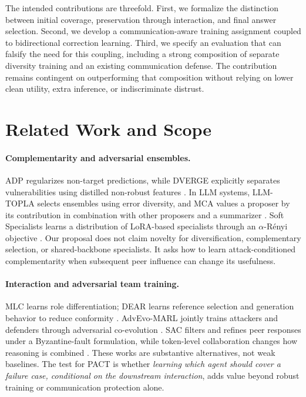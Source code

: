 \documentclass[10pt,twocolumn]{article}
\newcommand{\method}{\textsc{PACT}}
\begin{document}
The intended contributions are threefold. First, we formalize the distinction between initial coverage, preservation through interaction, and final answer selection. Second, we develop a communication-aware training assignment coupled to bidirectional correction learning. Third, we specify an evaluation that can falsify the need for this coupling, including a strong composition of separate diversity training and an existing communication defense. The contribution remains contingent on outperforming that composition without relying on lower clean utility, extra inference, or indiscriminate distrust.

\section{Related Work and Scope}
\label{sec:related}
\paragraph{Complementarity and adversarial ensembles.}
ADP regularizes non-target predictions, while DVERGE explicitly separates vulnerabilities using distilled non-robust features \citep{pang2019adp,yang2020dverge}. In LLM systems, LLM-TOPLA selects ensembles using error diversity, and MCA values a proposer by its contribution in combination with other proposers and a summarizer \citep{tekin2024topla,zhang2026mca}. Soft Specialists learns a distribution of LoRA-based specialists through an $\alpha$-R\'enyi objective \citep{cordero2026specialists}. Our proposal does not claim novelty for diversification, complementary selection, or shared-backbone specialists. It asks how to learn attack-conditioned complementarity when subsequent peer influence can change its usefulness.

\paragraph{Interaction and adversarial team training.}
MLC learns role differentiation; DEAR learns reference selection and generation behavior to reduce conformity \citep{li2025mlc,wu2026dear}. AdvEvo-MARL jointly trains attackers and defenders through adversarial co-evolution \citep{pan2025advevo}. SAC filters and refines peer responses under a Byzantine-fault formulation, while token-level collaboration changes how reasoning is combined \citep{lee2026sac,liu2026consensus}. These works are substantive alternatives, not weak baselines. The test for \method{} is whether \emph{learning which agent should cover a failure case, conditional on the downstream interaction}, adds value beyond robust training or communication protection alone.
\end{document}
